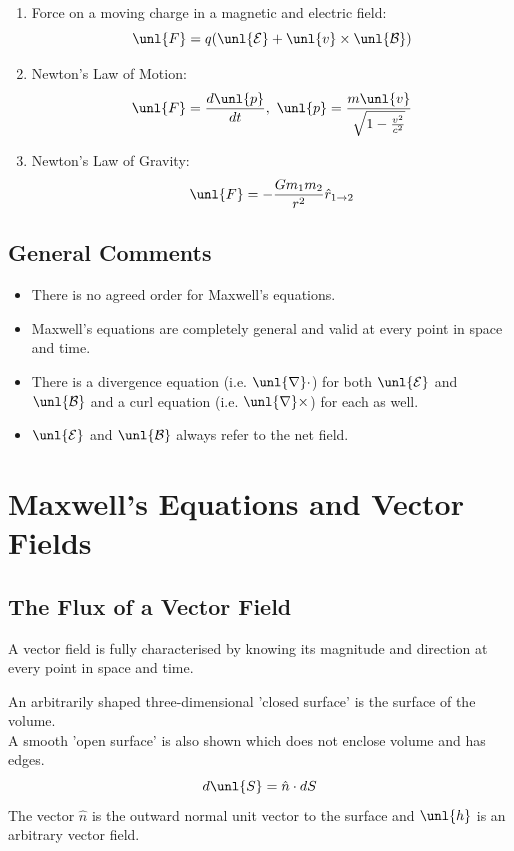\documentclass[a4paper, 11pt, normalem]{report}
\newcommand\E{\mathcal{E}}
\newcommand\uE{\unl{\E}}
\newcommand\B{\mathcal{B}}
\newcommand\uB{\unl{\B}}
\newcommand\del{\unl{\nabla}}
\newcommand\hn{\hat{n}}
\begin{document}
\begin{enumerate}
\begin{itemize}
        \end{itemize}
    \item Force on a moving charge in a magnetic and electric field:
        \begin{equation*}
            \unl{F} = q(\uE + \unl{v} \times \uB)
        \end{equation*}
    \item Newton's Law of Motion:
        \begin{equation*}
            \unl{F} = \frac{d\unl{p}}{dt}, ~ \unl{p} = \frac{m\unl{v}}{\sqrt{1 - \frac{v^2}{c^2}}}
        \end{equation*}
    \item Newton's Law of Gravity:
        \begin{equation*}
            \unl{F} = -\frac{Gm_1 m_2}{r^2}\hat{r}_{1 \to 2}
        \end{equation*}
\end{enumerate}

\subsection{General Comments}
\begin{itemize}
    \item There is no agreed order for Maxwell's equations.
    \item Maxwell's equations are completely general and valid at every point in space and time.
    \item There is a divergence equation (i.e. $\del \cdot$) for both $\uE$ and $\uB$ and a curl equation (i.e. $\del \times$) for each as well.
    \item $\uE$ and $\uB$ always refer to the net field.
\end{itemize}

\section{Maxwell's Equations and Vector Fields}
\subsection{The Flux of a Vector Field}
A vector field is fully characterised by knowing its magnitude and direction at every point in space and time.

An arbitrarily shaped three-dimensional 'closed surface' is the surface of the volume. \\
A smooth 'open surface' is also shown which does not enclose volume and has edges.
\begin{equation*}
    d\unl{S} = \hn \cdot dS
\end{equation*}
The vector $\hn$ is the outward normal unit vector to the surface and $\unl{h}$ is an arbitrary vector field.
\end{document}
